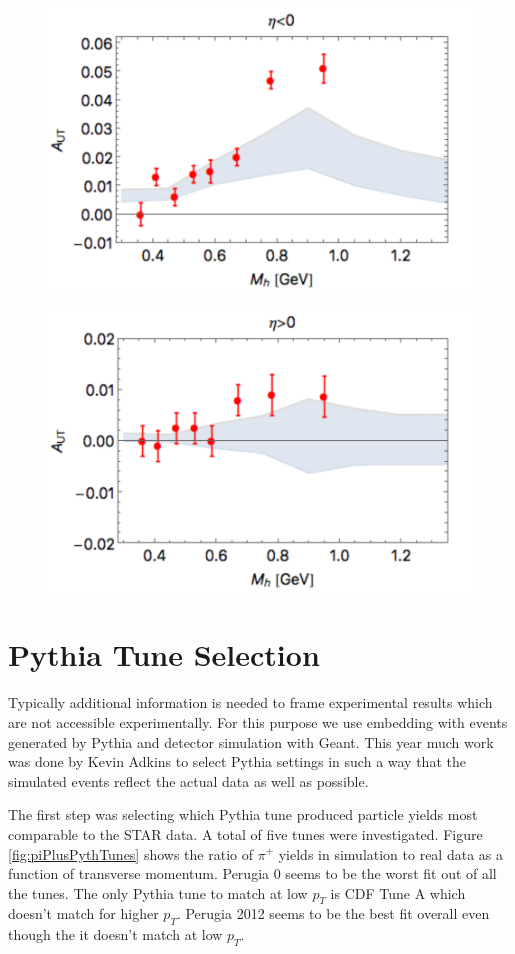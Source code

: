 \documentclass[abstract = on,listof=totoc, bibliography=totoc]{scrreprt}
\begin{document}
\begin{figure}
\begin{center}
\includegraphics[width = .6\textwidth]{A_Mh_eta-neg}
\caption[]{}
\label{fig:A_Mh_eta-neg_calc}
\end{center}
\end{figure}

\begin{figure}
\begin{center}
\includegraphics[width = .6\textwidth]{A_Mh_eta-pos}
\caption[]{}
\label{fig:A_Mh_eta-pos_calc}
\end{center}
\end{figure}



\chapter{Pythia Tune Selection}

Typically additional information is needed to frame experimental results which are not accessible experimentally. For this purpose we use embedding with events generated by  Pythia and detector simulation with Geant. This year much work was done by Kevin Adkins to select Pythia settings in such a way that the simulated events reflect the actual data as well as possible. 

The first step was selecting which Pythia tune produced particle yields most comparable to the STAR data. A total of five tunes were investigated. Figure \ref{fig:piPlusPythTunes} shows the ratio of $\pi^+$ yields in simulation to real data as a function of transverse momentum. Perugia 0 seems to be the worst fit out of all the tunes. The only Pythia tune to match at low $p_T$ is CDF Tune A which doesn't match for higher $p_T$. Perugia 2012 seems to be the  best fit overall even though the it doesn't match at low $p_T$. 
\end{document}
